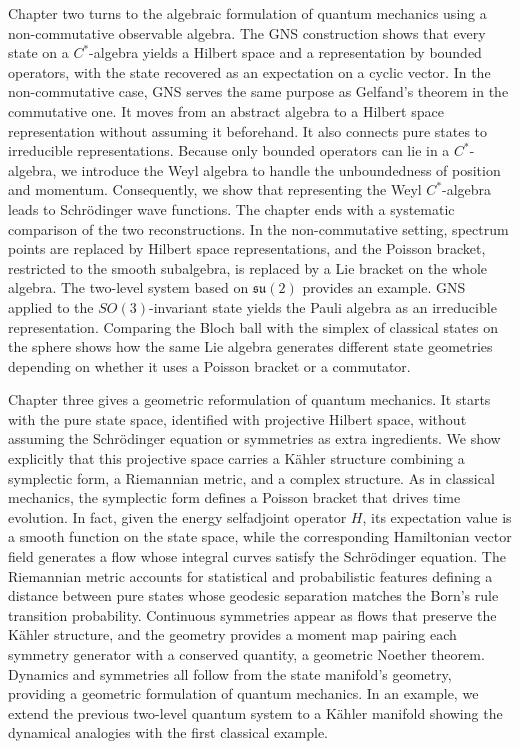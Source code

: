 Chapter two turns to the algebraic formulation of quantum mechanics using a non-commutative observable algebra. The GNS construction shows that every state on a $C^*$-algebra yields a Hilbert space and a representation by bounded operators, with the state recovered as an expectation on a cyclic vector. In the non-commutative case, GNS serves the same purpose as Gelfand's theorem in the commutative one. It moves from an abstract algebra to a Hilbert space representation without assuming it beforehand. It also connects pure states to irreducible representations. Because only bounded operators can lie in a $C^*$-algebra, we introduce the Weyl algebra to handle the unboundedness of position and momentum. Consequently, we show that representing the Weyl $C^*$-algebra leads to Schr\"odinger wave functions. The chapter ends with a systematic comparison of the two reconstructions. In the non-commutative setting, spectrum points are replaced by Hilbert space representations, and the Poisson bracket, restricted to the smooth subalgebra, is replaced by a Lie bracket on the whole algebra. The two-level system based on $\mathfrak{su}(2)$ provides an example. GNS applied to the $SO(3)$-invariant state yields the Pauli algebra as an irreducible representation. Comparing the Bloch ball with the simplex of classical states on the sphere shows how the same Lie algebra generates different state geometries depending on whether it uses a Poisson bracket or a commutator.

Chapter three gives a geometric reformulation of quantum mechanics. It starts with the pure state space, identified with projective Hilbert space, without assuming the Schrödinger equation or symmetries as extra ingredients. We show explicitly that this projective space carries a Kähler structure combining a symplectic form, a Riemannian metric, and a complex structure. As in classical mechanics, the symplectic form defines a Poisson bracket that drives time evolution. In fact, given the energy selfadjoint operator $H$, its expectation value is a smooth function on the state space, while the corresponding Hamiltonian vector field generates a flow whose integral curves satisfy the Schrödinger equation. The Riemannian metric accounts for statistical and probabilistic features defining a distance between pure states whose geodesic separation matches the Born's rule transition probability. Continuous symmetries appear as flows that preserve the Kähler structure, and the geometry provides a moment map pairing each symmetry generator with a conserved quantity, a geometric Noether theorem. Dynamics and symmetries all follow from the state manifold's geometry, providing a geometric formulation of quantum mechanics. In an example, we extend the previous two-level quantum system to a Kähler manifold showing the dynamical analogies with the first classical example.
\label{cap:introduzione}

